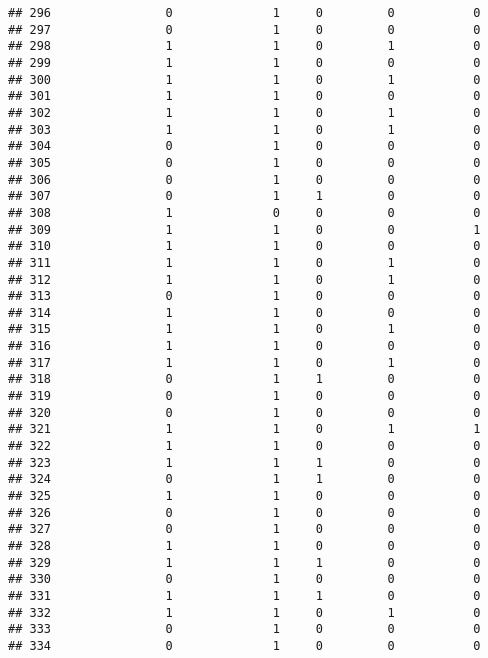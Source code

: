 \documentclass[]{article}
\begin{document}
\begin{verbatim}
## 296                0              1     0         0           0
## 297                0              1     0         0           0
## 298                1              1     0         1           0
## 299                1              1     0         0           0
## 300                1              1     0         1           0
## 301                1              1     0         0           0
## 302                1              1     0         1           0
## 303                1              1     0         1           0
## 304                0              1     0         0           0
## 305                0              1     0         0           0
## 306                0              1     0         0           0
## 307                0              1     1         0           0
## 308                1              0     0         0           0
## 309                1              1     0         0           1
## 310                1              1     0         0           0
## 311                1              1     0         1           0
## 312                1              1     0         1           0
## 313                0              1     0         0           0
## 314                1              1     0         0           0
## 315                1              1     0         1           0
## 316                1              1     0         0           0
## 317                1              1     0         1           0
## 318                0              1     1         0           0
## 319                0              1     0         0           0
## 320                0              1     0         0           0
## 321                1              1     0         1           1
## 322                1              1     0         0           0
## 323                1              1     1         0           0
## 324                0              1     1         0           0
## 325                1              1     0         0           0
## 326                0              1     0         0           0
## 327                0              1     0         0           0
## 328                1              1     0         0           0
## 329                1              1     1         0           0
## 330                0              1     0         0           0
## 331                1              1     1         0           0
## 332                1              1     0         1           0
## 333                0              1     0         0           0
## 334                0              1     0         0           0

\end{verbatim}
\end{document}
